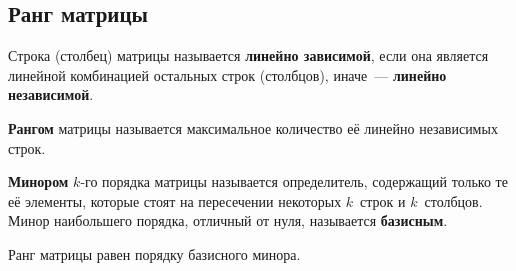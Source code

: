 \subsection{Ранг матрицы}
Строка (столбец) матрицы называется \textbf{линейно зависимой}, если она является линейной комбинацией остальных строк (столбцов), иначе~--- \textbf{линейно независимой}.

 \textbf{Рангом} матрицы называется максимальное количество её линейно независимых строк.

 \textbf{Минором} $k$-го порядка матрицы называется определитель, содержащий только те её элементы, которые стоят на пересечении некоторых $k$~строк и $k$~столбцов.
Минор наибольшего порядка, отличный от нуля, называется \textbf{базисным}.

\begin{theorem}
Ранг матрицы равен порядку базисного минора.
\end{theorem}

